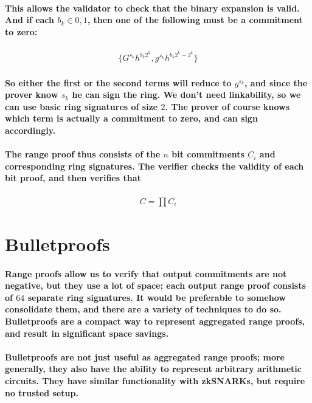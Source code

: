 \documentclass{article}
\begin{document}
\paragraph{This allows the validator to check that the binary expansion is valid.  And if each $b_k \in {0, 1}$, then one of the following must be a commitment to zero:}

\begin{eqnarray}
  \{G^{s_k} h^{b_k 2^k}, g^{s_k} h^{b_k 2^k - 2^k}\}
\end{eqnarray}

\paragraph{So either the first or the second terms will reduce to $g^{s_k}$, and since the prover know $s_k$ he can sign the ring.  We don’t need linkability, so we can use basic ring signatures of size $2$. The prover of course knows which term is actually a commitment to zero, and can sign accordingly.}

\paragraph{The range proof thus consists of the $n$ bit commitments $C_i$ and corresponding ring signatures.  The verifier checks the validity of each bit proof, and then verifies that}

\begin{eqnarray}
  C = \prod{C_i}
\end{eqnarray}



\section{Bulletproofs}

\paragraph{Range proofs allow us to verify that output commitments are not negative, but they use a lot of space; each output range proof consists of $64$ separate ring signatures.  It would be preferable to somehow consolidate them, and there are a variety of techniques to do so.  Bulletproofs are a compact way to represent aggregated range proofs, and result in significant space savings.}

\paragraph{Bulletproofs are not just useful as aggregated range proofs; more generally, they also have the ability to represent arbitrary arithmetic circuits.  They have similar functionality with zkSNARKs, but require no trusted setup.}
\end{document}
